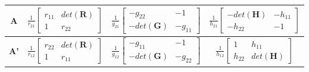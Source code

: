 \documentclass[a4paper,twocolumn,10pt]{article}
\begin{document}
{\begin{tabular}{@{}|@{}c@{}|@{}c@{}|@{}c@{}|@{}c@{}|}
\hline \textbf{A} & $\frac{1}{r_{21}}\begin{bmatrix}r_{11} & det(\textbf{R})\\ 1 & r_{22}\end{bmatrix}$ & $\frac{1}{g_{21}}\begin{bmatrix}-g_{22} & -1\\ -det(\textbf{G}) & -g_{11}\end{bmatrix}$ & $\frac{1}{h_{21}}\begin{bmatrix}-det(\textbf{H}) & -h_{11}\\ -h_{22} & -1\end{bmatrix}$\\
\hline \textbf{A'} & $\frac{1}{r_{12}}\begin{bmatrix}r_{22} & det(\textbf{R})\\ 1 & r_{11}\end{bmatrix}$ & $\frac{1}{g_{12}}\begin{bmatrix}-g_{11} & -1\\ -det(\textbf{G}) & -g_{22}\end{bmatrix}$ & $\frac{1}{h_{12}}\begin{bmatrix}1 & h_{11}\\ h_{22} & det(\textbf{H})\end{bmatrix}$\\
\hline 
\end{tabular}}\\\\\\
\end{document}
